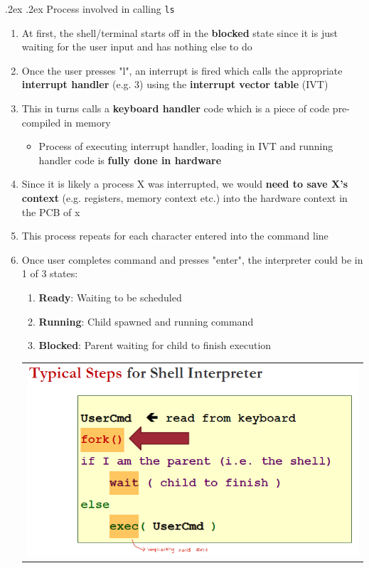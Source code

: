 \documentclass[13pt,landscape,a4paper]{article}
\makeatletter
\renewcommand{\section}{\@startsection{section}{1}{0mm}%
    {.2ex}%
    {.2ex}%
    {\color{myblue}\sffamily\small\bfseries}}
\makeatother
\begin{document}
\begin{multicols*}{3}
        \section{Process involved in calling \texttt{ls}}
        \begin{enumerate}
            \item At first, the shell/terminal starts off in the \textbf{blocked} state since it is just waiting for the user input and has nothing else to do
            \item Once the user presses "l", an interrupt is fired which calls the appropriate \textbf{interrupt handler} (e.g. 3) using the \textbf{interrupt vector table} (IVT)
            \item This in turns calls a \textbf{keyboard handler} code which is a piece of code pre-compiled in memory
            \begin{itemize}
                \item Process of executing interrupt handler, loading in IVT and running handler code is \textbf{fully done in hardware}
            \end{itemize}
            \item Since it is likely a process X was interrupted, we would \textbf{need to save X's context} (e.g. registers, memory context etc.) into the hardware context in the PCB of x
            \item This process repeats for each character entered into the command line
            \item Once user completes command and presses "enter", the interpreter could be in 1 of 3 states:
            \begin{enumerate}
                \item \textbf{Ready}: Waiting to be scheduled
                \item \textbf{Running}: Child spawned and running command
                \item \textbf{Blocked}: Parent waiting for child to finish execution
            \end{enumerate}
            \begin{tabular}{l}
                \includegraphics[width=0.40\linewidth]{shell}

\end{tabular}
\end{enumerate}
\end{multicols*}
\end{document}
